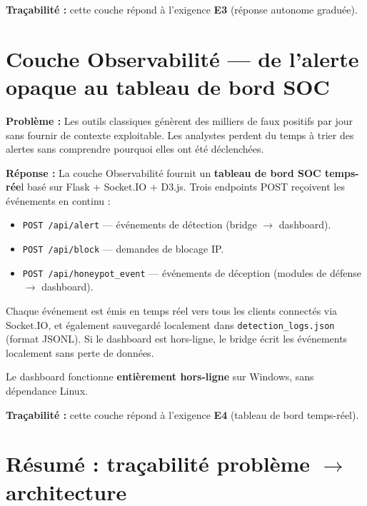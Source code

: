 \documentclass[12pt,a4paper]{article}
\newcommand{\problem}{\textcolor{accentred}{\textbf{Probl\`{e}me : }}}
\newcommand{\answer}{\textcolor{accentgreen}{\textbf{R\'{e}ponse : }}}
\begin{document}
\bigskip
\noindent \textbf{Tra\c{c}abilit\'{e} :} cette couche r\'{e}pond \`{a} l'exigence
\textbf{E3} (r\'{e}ponse autonome gradu\'{e}e).

\section{Couche Observabilit\'{e} --- de l'alerte opaque au tableau de bord SOC}

\problem Les outils classiques g\'{e}n\`{e}rent des milliers de faux positifs
par jour sans fournir de contexte exploitable. Les analystes perdent du temps
\`{a} trier des alertes sans comprendre pourquoi elles ont \'{e}t\'{e} d\'{e}clench\'{e}es.

\answer La couche Observabilit\'{e} fournit un \textbf{tableau de bord SOC
temps-r\'{e}e}l bas\'{e} sur Flask + Socket.IO + D3.js. Trois endpoints POST
re\c{c}oivent les \'{e}v\'{e}nements en continu :

\begin{itemize}[nosep,leftmargin=1.5em]
  \item \texttt{POST /api/alert} --- \'{e}v\'{e}nements de d\'{e}tection
        (bridge $\rightarrow$ dashboard).
  \item \texttt{POST /api/block} --- demandes de blocage IP.
  \item \texttt{POST /api/honeypot\_event} --- \'{e}v\'{e}nements de d\'{e}ception
        (modules de d\'{e}fense $\rightarrow$ dashboard).
\end{itemize}

\noindent Chaque \'{e}v\'{e}nement est \'{e}mis en temps r\'{e}el vers tous les
clients connect\'{e}s via Socket.IO, et \'{e}galement sauvegard\'{e} localement
dans \texttt{detection\_logs.json} (format JSONL). Si le dashboard est hors-ligne,
le bridge \'{e}crit les \'{e}v\'{e}nements localement sans perte de donn\'{e}es.

Le dashboard fonctionne \textbf{enti\`{e}rement hors-ligne} sur Windows, sans
d\'{e}pendance Linux.

\bigskip
\noindent \textbf{Tra\c{c}abilit\'{e} :} cette couche r\'{e}pond \`{a} l'exigence
\textbf{E4} (tableau de bord temps-r\'{e}el).

\section{R\'{e}sum\'{e} : tra\c{c}abilit\'{e} probl\`{e}me $\rightarrow$ architecture}
\end{document}
